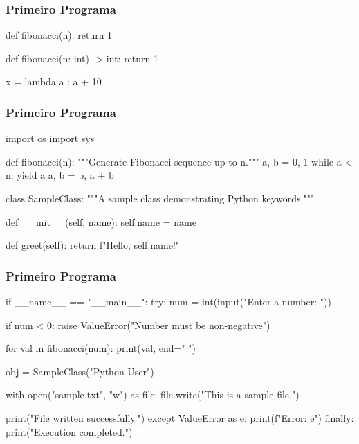 \documentclass{beamer}
\begin{document}
\begin{frame}[containsverbatim]
    \frametitle{Primeiro Programa}
    \begin{pythonlst}
def fibonacci(n):
        return 1

def fibonacci(n: int) -> int:
        return 1

x = lambda a : a + 10
    \end{pythonlst}
\end{frame}

\begin{frame}[containsverbatim]
    \frametitle{Primeiro Programa}
\begin{pythonlst}
    import os
    import sys
    
    def fibonacci(n):
        """Generate Fibonacci sequence up to n."""
        a, b = 0, 1
        while a < n:
            yield a
            a, b = b, a + b
    
    class SampleClass:
        """A sample class demonstrating Python keywords."""
        
        def __init__(self, name):
            self.name = name
        
        def greet(self):
            return f"Hello, {self.name}!"
\end{pythonlst}
\end{frame}

\begin{frame}[containsverbatim]
    \frametitle{Primeiro Programa}
\begin{pythonlst}
    if __name__ == "__main__":
        try:
            num = int(input("Enter a number: "))
            
            if num < 0:
                raise ValueError("Number must be non-negative")
            
            for val in fibonacci(num):
                print(val, end=" ")
            
            obj = SampleClass("Python User")
            
            with open("sample.txt", "w") as file:
                file.write("This is a sample file.")
                
            print("File written successfully.")
        except ValueError as e:
            print(f"Error: {e}")
        finally:
            print("Execution completed.")
\end{pythonlst}
\end{frame}
\end{document}
